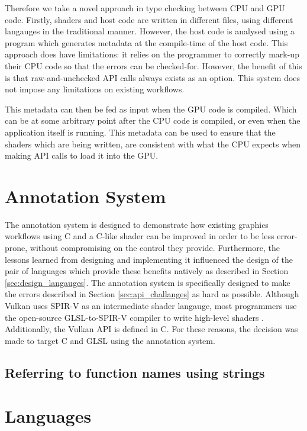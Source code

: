 \documentclass[a4paper,12pt,twoside,openright]{report}
\begin{document}
Therefore we take a novel approach in type checking between CPU and GPU code.
Firstly, shaders and host code are written in different files, using different
langauges in the traditional manner. However, the host code is analysed using a
program which generates metadata at the compile-time of the host code. This
approach does have limitations: it relies on the programmer to correctly
mark-up their CPU code so that the errors can be checked-for. However, the
benefit of this is that raw-and-unchecked API calls always exists as an option.
This system does not impose any limitations on existing workflows.

This metadata can then be fed as input when the GPU code is compiled. Which can
be at some arbitrary point after the CPU code is compiled, or even when the
application itself is running. This metadata can be used to ensure that the
shaders which are being written, are consistent with what the CPU expects when
making API calls to load it into the GPU.

\section{Annotation System}

\label{sec:design_annotation_processor}

The annotation system is designed to demonstrate how existing graphics
workflows using C and a C-like shader can be improved in order to be less
error-prone, without compromising on the control they provide. Furthermore, the
lessons learned from designing and implementing it influenced the design of the
pair of languages which provide these benefits natively as described in Section
\ref{sec:design_langauges}. The annotation system is specifically designed to
make the errors described in Section \ref{sec:api_challanges} as hard as
possible. Although Vulkan uses SPIR-V as an intermediate shader langauge, most
programmers use the open-source GLSL-to-SPIR-V compiler to write high-level
shaders \cite{TODO}. Additionally, the Vulkan API is defined in C. For these
reasons, the decision was made to target C and GLSL using the annotation
system.

\subsection{Referring to function names using strings}

\section{Languages}
\end{document}
